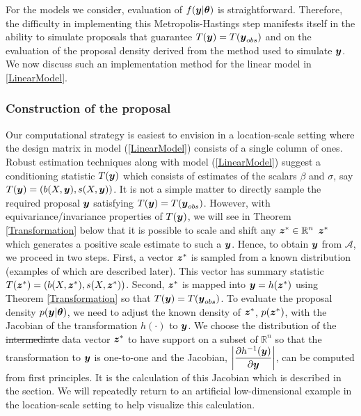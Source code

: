\documentclass[11pt]{article}
\def\bth{\mbox{\boldmath $\theta$}}
\newcommand{\by}{\mbox{\boldmath $y$}}
\newcommand{\bz}{\mbox{\boldmath $z$}}
\newcommand{\green}[1]{{\color{green}#1}}
\begin{document}
For the models we consider, evaluation of $f(\by | \bth)$ is straightforward.  Therefore, the difficulty in implementing this Metropolis-Hastings step manifests  itself in the ability to simulate proposals that guarantee $T(\by) = T(\by_{obs})$ and on the evaluation of the proposal density derived from the method used to simulate $\by$. We now discuss such an implementation method for the linear model in \eqref{LinearModel}.

\subsubsection{Construction of the proposal}
Our computational strategy is easiest to envision in a location-scale setting where 
the design matrix in model (\ref{LinearModel}) consists of a single column of ones.  Robust estimation techniques along
with model (\ref{LinearModel}) suggest a conditioning statistic $T(\by)$ which consists of
estimates of the scalars $\beta$ and $\sigma$, say $T(\by)=(b(X,\by),
s(X,\by))$.  It is not a simple matter to directly sample the required
proposal $\by$ satisfying $T(\by)=T(\by_{obs})$. However, 
  with equivariance/invariance properties of $T(\by)$, we will see in Theorem \ref{Transformation} below
    that it is possible to scale and shift any \sout{$\bz^{*}\in \mathbb R^{n}$} \green{$\bz^{*}$ which generates 
a positive scale estimate} to such a
    $\by$. Hence, to obtain $\by$ from $\mathcal A$, we proceed
  in two steps. First, a vector $\bz^*$ is sampled from a known
  distribution (examples of which are described later). This vector has summary statistic   
$T(\bz^*) = (b(X,\bz^*), s(X,\bz^*))$.  Second, $\bz^*$ is mapped into $\by =h(\bz^*)$
using Theorem \ref{Transformation} so that $T(\by)=T(\by_{obs})$. To
evaluate the proposal density $p(\by|\bth)$, we need to adjust
the known density of $\bz^*$, $p(\bz^*)$, with the Jacobian of
the transformation $h(\cdot)$ to $\by$. We choose the
distribution of the \green{\sout{intermediate}} data vector $\bz^*$ to have support
\green{on a subset of $\mathbb R^n$ so that}
the transformation to $\by$ is one-to-one and the Jacobian,
$\displaystyle \left|\frac{\partial h^{-1}(\by)}{\partial \by}\right|$, can be computed from first principles. It is the calculation of this Jacobian which is described in the section. We will repeatedly return to an artificial low-dimensional example in the location-scale setting to help visualize this calculation.  
\end{document}
